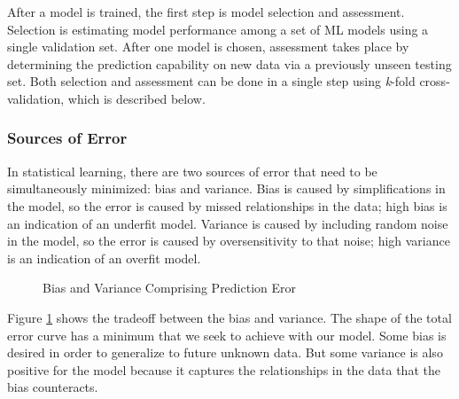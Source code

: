 After a model is trained, the first step is model selection and assessment.
Selection is estimating model performance among a set of \gls{ML} models using a
single validation set.  After one model is chosen, assessment takes place by
determining the prediction capability on new data via a previously unseen
testing set. Both selection and assessment can be done in a single step using
\textit{k}-fold cross-validation, which is described below.

\subsubsection{Sources of Error} 

In statistical learning, there are two sources of error that need to be
simultaneously minimized: bias and variance. Bias is caused by simplifications
in the model, so the error is caused by missed relationships in the data; high
bias is an indication of an underfit model.  Variance is caused by including
random noise in the model, so the error is caused by oversensitivity to that
noise; high variance is an indication of an overfit model. 

\begin{figure}[!htb]
  \caption{Bias and Variance Comprising Prediction Eror}
  \label{fig:bvtradeoff}
\end{figure}

Figure \ref{fig:bvtradeoff} shows the tradeoff between the bias and variance.
The shape of the total error curve has a minimum that we seek to achieve with
our model. Some bias is desired in order to generalize to future unknown data.
But some variance is also positive for the model because it captures the
relationships in the data that the bias counteracts. 

